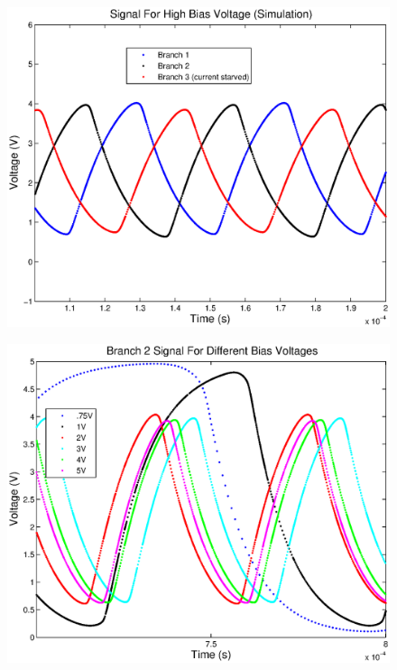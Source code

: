 \documentclass{article}
\begin{document}
\begin{figure}[H]
\centering
\includegraphics[scale=1]{highBiasSigSim.eps}
\caption{}
\label{highBiasSim}
\end{figure}

\begin{figure}[H]
\centering
\includegraphics[scale=1]{branch2DiffBiasSim.eps}
\caption{}
\label{branch2DiffBiasSim}
\end{figure}
\end{document}
